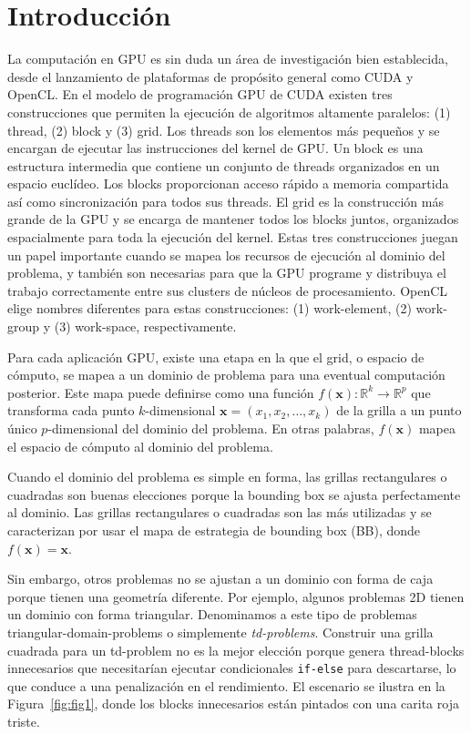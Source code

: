 \documentclass[twocolumn,10pt,a4paper]{article}
\begin{document}
\section{Introducción}
\label{sec:introduction}

La computación en GPU es sin duda un área de investigación bien establecida, desde el lanzamiento de plataformas de propósito
general como CUDA y OpenCL. En el modelo de
programación GPU de CUDA existen tres construcciones que permiten la ejecución
de algoritmos altamente paralelos: (1) thread, (2) block y (3) grid. Los
threads son los elementos más pequeños y se encargan de ejecutar las
instrucciones del kernel de GPU. Un block es una estructura intermedia que
contiene un conjunto de threads organizados en un espacio euclídeo. Los blocks
proporcionan acceso rápido a memoria compartida así como sincronización para
todos sus threads. El grid es la construcción más grande de la GPU y se encarga
de mantener todos los blocks juntos, organizados espacialmente para toda la
ejecución del kernel. Estas tres construcciones juegan un papel importante
cuando se mapea los recursos de ejecución al dominio del problema, y también
son necesarias para que la GPU programe y distribuya el trabajo correctamente
entre sus clusters de núcleos de procesamiento. OpenCL elige nombres
diferentes para estas construcciones: (1) work-element, (2) work-group y (3)
work-space, respectivamente.

Para cada aplicación GPU, existe una etapa en la que el grid, o espacio de
cómputo, se mapea a un dominio de problema para una eventual computación
posterior. Este mapa puede definirse como una función
$f(\mathbf{x}): \mathbb{R}^k \rightarrow \mathbb{R}^p$
que transforma cada punto $k$-dimensional
$\mathbf{x} = (x_1, x_2, \ldots, x_k)$ de la grilla a un punto único
$p$-dimensional del dominio del problema. En otras palabras, $f(\mathbf{x})$
mapea el espacio de cómputo al dominio del problema.

Cuando el dominio del problema es simple en forma, las grillas rectangulares o
cuadradas son buenas elecciones porque la bounding box se ajusta perfectamente
al dominio. Las grillas rectangulares o cuadradas son las más utilizadas y se
caracterizan por usar el mapa de estrategia de bounding box (BB), donde
$f(\mathbf{x}) = \mathbf{x}$.

Sin embargo, otros problemas no se ajustan a un dominio con forma de caja
porque tienen una geometría diferente. Por ejemplo, algunos problemas 2D tienen
un dominio con forma triangular. Denominamos a este tipo de problemas
triangular-domain-problems o simplemente \emph{td-problems}. Construir una
grilla cuadrada para un td-problem no es la mejor elección porque genera
thread-blocks innecesarios que necesitarían ejecutar condicionales
\texttt{if-else} para descartarse, lo que conduce a una penalización en el
rendimiento. El escenario se ilustra en la Figura~\ref{fig:fig1}, donde los
blocks innecesarios están pintados con una carita roja triste.
\end{document}
